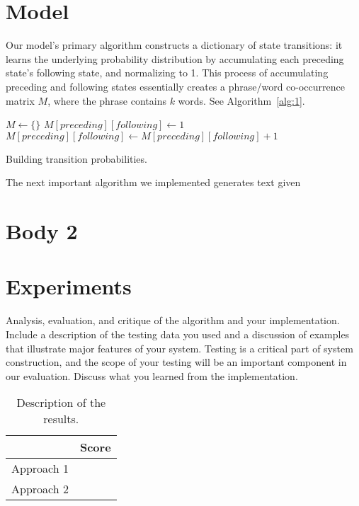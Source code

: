 \documentclass[11pt]{article}
\begin{document}
\section{Model}

Our model's primary algorithm constructs a dictionary of state transitions: it  learns the underlying probability distribution by accumulating each preceding state's following state, and normalizing to 1. This process of accumulating preceding and following states essentially creates a phrase/word co-occurrence matrix \(M\), where the phrase contains \(k\) words. See Algorithm~\ref{alg:1}.

\begin{algorithm}
  \begin{algorithmic}
          {$M \gets \{\}$}
        \EndIf
          {$M[preceding][following] \gets 1$}
        \Else
          {$ M[preceding][following] \gets M[preceding][following]+1$}
        \EndIf
      \EndFor
    \EndFor
    \EndProcedure{}
  \end{algorithmic}
  \caption{Building transition probabilities.}
  \label{alg:1}
\end{algorithm}

The next important algorithm we implemented generates text given 

\section{Body 2}

\section{Experiments}
Analysis, evaluation, and critique of the algorithm and your
implementation. Include a description of the testing data you used and
a discussion of examples that illustrate major features of your
system. Testing is a critical part of system construction, and the
scope of your testing will be an important component in our
evaluation. Discuss what you learned from the implementation.

\begin{table}
  \centering
  \begin{tabular}{ll}
    \toprule
    & Score \\
    \midrule
    Approach 1 & \\
    Approach 2 & \\
    \bottomrule
  \end{tabular}
  \caption{Description of the results.}
\end{table}
\end{document}
